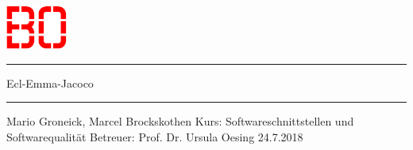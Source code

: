 \begin{titlepage}
\vskip 200pt
\begin{center}
\includegraphics{BO-Logo_o_Wortmarke.png}
\vskip 20pt
\rule{10cm}{0.7pt}
\vskip 20pt
\huge{Ecl-Emma-Jacoco}
\rule{10cm}{0.7pt}
\vskip 20pt
\large{Mario Groneick, Marcel Brockskothen}
\vskip 20pt
\large{Kurs: Softwareschnittstellen und Softwarequalität}
\vskip 20pt
\large{Betreuer: Prof. Dr. Ursula Oesing}
\vskip 100pt
\large{24.7.2018}
\end{center}
\end{titlepage}
